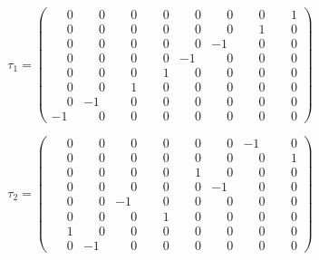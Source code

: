 \documentclass[10pt]{article}
\begin{document}
\[
\tau_{1} = \left(\begin{smallmatrix}
\phantom{-}0 & \phantom{-}0 & \phantom{-}0 & \phantom{-}0 & \phantom{-}0 & \phantom{-}0 & \phantom{-}0 & \phantom{-}1 \\
\phantom{-}0 & \phantom{-}0 & \phantom{-}0 & \phantom{-}0 & \phantom{-}0 & \phantom{-}0 & \phantom{-}1 & \phantom{-}0 \\
\phantom{-}0 & \phantom{-}0 & \phantom{-}0 & \phantom{-}0 & \phantom{-}0 & -1 & \phantom{-}0 & \phantom{-}0 \\
\phantom{-}0 & \phantom{-}0 & \phantom{-}0 & \phantom{-}0 & -1 & \phantom{-}0 & \phantom{-}0 & \phantom{-}0 \\
\phantom{-}0 & \phantom{-}0 & \phantom{-}0 & \phantom{-}1 & \phantom{-}0 & \phantom{-}0 & \phantom{-}0 & \phantom{-}0 \\
\phantom{-}0 & \phantom{-}0 & \phantom{-}1 & \phantom{-}0 & \phantom{-}0 & \phantom{-}0 & \phantom{-}0 & \phantom{-}0 \\
\phantom{-}0 & -1 & \phantom{-}0 & \phantom{-}0 & \phantom{-}0 & \phantom{-}0 & \phantom{-}0 & \phantom{-}0 \\
-1 & \phantom{-}0 & \phantom{-}0 & \phantom{-}0 & \phantom{-}0 & \phantom{-}0 & \phantom{-}0 & \phantom{-}0
\end{smallmatrix}\right)
\]

\[
\tau_{2} = \left(\begin{smallmatrix}
\phantom{-}0 & \phantom{-}0 & \phantom{-}0 & \phantom{-}0 & \phantom{-}0 & \phantom{-}0 & -1 & \phantom{-}0 \\
\phantom{-}0 & \phantom{-}0 & \phantom{-}0 & \phantom{-}0 & \phantom{-}0 & \phantom{-}0 & \phantom{-}0 & \phantom{-}1 \\
\phantom{-}0 & \phantom{-}0 & \phantom{-}0 & \phantom{-}0 & \phantom{-}1 & \phantom{-}0 & \phantom{-}0 & \phantom{-}0 \\
\phantom{-}0 & \phantom{-}0 & \phantom{-}0 & \phantom{-}0 & \phantom{-}0 & -1 & \phantom{-}0 & \phantom{-}0 \\
\phantom{-}0 & \phantom{-}0 & -1 & \phantom{-}0 & \phantom{-}0 & \phantom{-}0 & \phantom{-}0 & \phantom{-}0 \\
\phantom{-}0 & \phantom{-}0 & \phantom{-}0 & \phantom{-}1 & \phantom{-}0 & \phantom{-}0 & \phantom{-}0 & \phantom{-}0 \\
\phantom{-}1 & \phantom{-}0 & \phantom{-}0 & \phantom{-}0 & \phantom{-}0 & \phantom{-}0 & \phantom{-}0 & \phantom{-}0 \\
\phantom{-}0 & -1 & \phantom{-}0 & \phantom{-}0 & \phantom{-}0 & \phantom{-}0 & \phantom{-}0 & \phantom{-}0
\end{smallmatrix}\right)
\]
\end{document}
